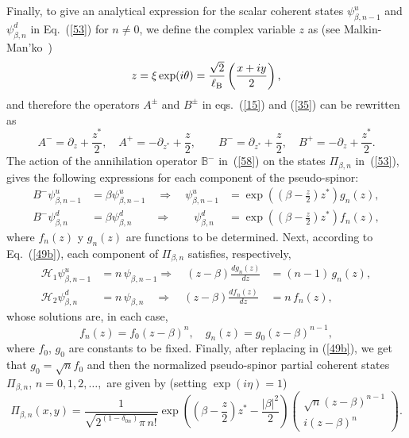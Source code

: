 \documentclass[aps,showpacs,showkeys]{revtex4}
\begin{document}
Finally, to give an analytical expression for the scalar coherent states $\psi^u_{\beta,n-1}$ and $\psi^d_{\beta,n}$ in Eq.~(\ref{53}) for $n\neq0$, we define the complex variable $z$ as (see Malkin-Man'ko~\cite{mm69})
\begin{equation}\label{59}
z=\xi\exp(i\theta)=\frac{\sqrt{2}}{\ell_{\rm B}}\left(\frac{x+iy}{2}\right),
\end{equation}
and therefore the operators $A^\pm$ and $B^\pm$ in eqs.~(\ref{15}) and (\ref{35}) can be rewritten as
	\begin{equation}
	A^-=\partial_{z}+\frac{z^\ast}{2}, \quad A^+=-\partial_{z^\ast}+\frac{z}{2}, \qquad
	B^-=\partial_{z^\ast}+\frac{z}{2}, \quad B^+=-\partial_{z}+\frac{z^\ast}{2}. \label{60b}
	\end{equation}
The action of the annihilation operator $\mathbb{B}^-$ in~(\ref{58}) on the states $\Pi_{\beta,n}$ in~(\ref{53}), gives the following expressions for each component of the pseudo-spinor:
	\begin{eqnarray}
	B^-\psi^u_{\beta,n-1}&=\beta \psi^u_{\beta,n-1} \quad\Rightarrow\quad \psi^u_{\beta,n-1}&=\exp\left(\left(\beta-\frac{z}{2}\right)z^\ast\right)g_n(z), \label{61b}
	\\	B^-\psi^d_{\beta,n}&=\beta \psi^d_{\beta,n} \qquad\Rightarrow\qquad \psi^d_{\beta,n}&=\exp\left(\left( \beta-\frac{z}{2}\right) z^\ast\right)f_n(z), \label{61a}
	\end{eqnarray}
where $f_n(z)$ y $g_n(z)$ are functions to be determined. Next, according to Eq.~(\ref{49b}), each component of 
$\Pi_{\beta,n}$ satisfies, respectively,
	\begin{eqnarray}
	\mathcal{H}_1 \psi^u_{\beta,n-1}&=n\,\psi_{\beta,n-1} \Rightarrow\quad  (z-\beta)\frac{dg_n(z)}{dz}&=(n-1)\,g_n(z), \label{62a}\\
	\mathcal{H}_2 \psi^d_{\beta,n}& =n\,\psi_{\beta,n} \quad\Rightarrow\quad (z-\beta)\frac{df_n(z)}{dz}&=n\,f_n(z), \label{62b}
	\end{eqnarray}
whose solutions are, in each case,
\begin{equation}\label{63}
f_n(z)=f_{0}(z-\beta)^n, \quad g_n(z)=g_{0}(z-\beta)^{n-1},
\end{equation}
where $f_{0}$, $g_{0}$ are constants to be fixed. Finally, after replacing in (\ref{49b}), we get that $g_{0}=\sqrt{n}f_{0}$ and then the normalized pseudo-spinor partial coherent states $ \Pi_{\beta,n}$, $n=0,1,2,\dots,$ are given by (setting $\exp\left(i\eta\right)=1$)
\begin{equation}\label{64}
\Pi_{\beta,n}(x,y)=\frac{1}{\sqrt{2^{(1-\delta_{0n})}\pi\,n!}}\exp\left(\left( \beta-\frac{z}{2}\right) z^\ast-\frac{\vert\beta\vert^2}{2}\right)
\left(
\begin{array}{c}
\sqrt{n}(z-\beta)^{n-1}\\
i(z-\beta)^{n}
\end{array}
\right).
\end{equation}
\end{document}
